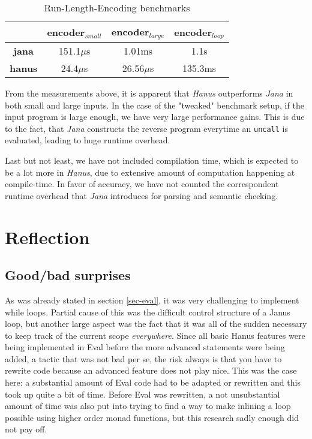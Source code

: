 \documentclass[12pt,a4paper]{article}
\newcommand{\inlinecode}[1]{\texttt{#1}}
\begin{document}
\begin{table}[h!]
\centering
\begin{tabular}{|c | c | c | c|}
\hline
& encoder$_{small}$ & encoder$_{large}$ & encoder$_{loop}$ \\
\hline
\textbf{jana} & 151.1$\mu$s & 1.01ms & 1.1s \\
\textbf{hanus} & 24.4$\mu$s & 26.56$\mu$s & 135.3ms\\
\hline
\end{tabular}
\caption{Run-Length-Encoding benchmarks}
\end{table}

From the measurements above, it is apparent that \textit{Hanus} outperforms \textit{Jana} in both small and large inputs. In the case of the "tweaked" benchmark setup, if the input program is large enough, we have very large performance gains. This is due to the fact, that \textit{Jana} constructs the reverse program everytime an \inlinecode{uncall} is evaluated, leading to huge runtime overhead.

Last but not least, we have not included compilation time, which is expected to be a lot more in \textit{Hanus}, due to extensive amount of computation happening at compile-time. In favor of accuracy, we have not counted the correspondent runtime overhead that \textit{Jana} introduces for parsing and semantic checking.

\section{Reflection}
\label{section:reflect}
    \subsection{Good/bad surprises}
                As was already stated in section \ref{sec-eval}, it was very challenging to implement while loops. Partial cause of this was the difficult control structure of a Janus loop\cite{lutz82}, but another large aspect was the fact that it was all of the sudden necessary to keep track of the current scope \emph{everywhere}. Since all basic Hanus features were being implemented in Eval before the more advanced statements were being added, a tactic that was not bad per se, the risk always is that you have to rewrite code because an advanced feature does not play nice. This was the case here: a substantial amount of Eval code had to be adapted or rewritten and this took up quite a bit of time. Before Eval was rewritten, a not unsubstantial amount of time was also put into trying to find a way to make inlining a loop possible using higher order monad functions, but this research sadly enough did not pay off.
\end{document}
